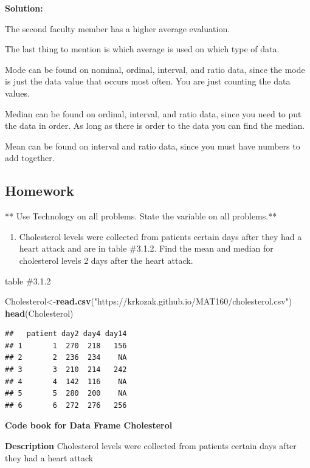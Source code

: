 \documentclass[
]{book}
\newenvironment{Shaded}{\begin{snugshade}}{\end{snugshade}}
\newcommand{\KeywordTok}[1]{\textcolor[rgb]{0.13,0.29,0.53}{\textbf{#1}}}
\newcommand{\NormalTok}[1]{#1}
\newcommand{\StringTok}[1]{\textcolor[rgb]{0.31,0.60,0.02}{#1}}
\providecommand{\tightlist}{%
  \setlength{\itemsep}{0pt}\setlength{\parskip}{0pt}}
\begin{document}
\textbf{Solution:}

The second faculty member has a higher average evaluation.

The last thing to mention is which average is used on which type of data.

Mode can be found on nominal, ordinal, interval, and ratio data, since the mode is just the data value that occurs most often. You are just counting the data values.

Median can be found on ordinal, interval, and ratio data, since you need to put the data in order. As long as there is order to the data you can find the median.

Mean can be found on interval and ratio data, since you must have numbers to add together.

\hypertarget{homework-3}{%
\subsection{Homework}\label{homework-3}}

** Use Technology on all problems. State the variable on all problems.**

\begin{enumerate}
\def\labelenumi{\arabic{enumi}.}
\tightlist
\item
  Cholesterol levels were collected from patients certain days after they had a heart attack and are in table \#3.1.2. Find the mean and median for cholesterol levels 2 days after the heart attack.
\end{enumerate}

table \#3.1.2

\begin{Shaded}
\begin{Highlighting}[]
\NormalTok{Cholesterol<-}\KeywordTok{read.csv}\NormalTok{(}\StringTok{"https://krkozak.github.io/MAT160/cholesterol.csv"}\NormalTok{)}
\KeywordTok{head}\NormalTok{(Cholesterol)}
\end{Highlighting}
\end{Shaded}

\begin{verbatim}
##   patient day2 day4 day14
## 1       1  270  218   156
## 2       2  236  234    NA
## 3       3  210  214   242
## 4       4  142  116    NA
## 5       5  280  200    NA
## 6       6  272  276   256
\end{verbatim}

\textbf{Code book for Data Frame Cholesterol}

\textbf{Description}
Cholesterol levels were collected from patients certain days after they had a heart attack
\end{document}
